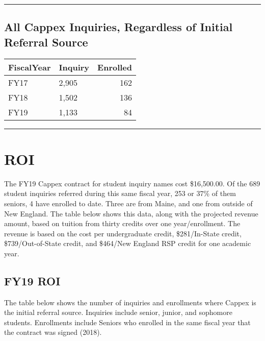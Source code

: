 \documentclass[]{article}
\begin{document}
\begin{center}\rule{0.5\linewidth}{\linethickness}\end{center}

\hypertarget{all-cappex-inquiries-regardless-of-initial-referral-source}{%
\subsection{\texorpdfstring{\textbf{All Cappex Inquiries}, Regardless of
Initial Referral
Source}{All Cappex Inquiries, Regardless of Initial Referral Source}}\label{all-cappex-inquiries-regardless-of-initial-referral-source}}

\begin{longtable}[]{@{}llr@{}}
\toprule
FiscalYear & Inquiry & Enrolled\tabularnewline
\midrule
\endhead
FY17 & 2,905 & 162\tabularnewline
FY18 & 1,502 & 136\tabularnewline
FY19 & 1,133 & 84\tabularnewline
\bottomrule
\end{longtable}

\begin{center}\rule{0.5\linewidth}{\linethickness}\end{center}

\hypertarget{roi}{%
\section{ROI}\label{roi}}

The FY19 Cappex contract for student inquiry names cost \$16,500.00. Of
the 689 student inquiries referred during this same fiscal year, 253 or
37\% of them seniors, 4 have enrolled to date. Three are from Maine, and
one from outside of New England. The table below shows this data, along
with the projected revenue amount, based on tuition from thirty credits
over one year/enrollment. The revenue is based on the cost per
undergraduate credit, \$281/In-State credit, \$739/Out-of-State credit,
and \$464/New England RSP credit for one academic year.

\hypertarget{fy19-roi}{%
\subsection{FY19 ROI}\label{fy19-roi}}

The table below shows the number of inquiries and enrollments where
Cappex is the initial referral source. Inquiries include senior, junior,
and sophomore students. Enrollments include Seniors who enrolled in the
same fiscal year that the contract was signed (2018).
\end{document}
